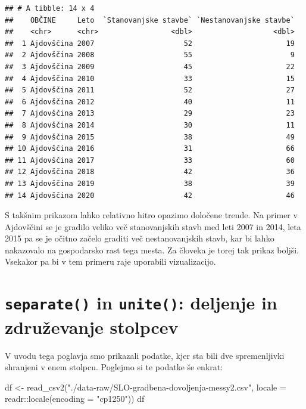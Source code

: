 \documentclass[
]{book}
\newenvironment{Shaded}{\begin{snugshade}}{\end{snugshade}}
\newcommand{\AttributeTok}[1]{\textcolor[rgb]{0.77,0.63,0.00}{#1}}
\newcommand{\FunctionTok}[1]{\textcolor[rgb]{0.00,0.00,0.00}{#1}}
\newcommand{\NormalTok}[1]{#1}
\newcommand{\OtherTok}[1]{\textcolor[rgb]{0.56,0.35,0.01}{#1}}
\newcommand{\SpecialCharTok}[1]{\textcolor[rgb]{0.00,0.00,0.00}{#1}}
\newcommand{\StringTok}[1]{\textcolor[rgb]{0.31,0.60,0.02}{#1}}
\begin{document}
\begin{verbatim}
## # A tibble: 14 x 4
##    OBČINE     Leto  `Stanovanjske stavbe` `Nestanovanjske stavbe`
##    <chr>      <chr>                 <dbl>                   <dbl>
##  1 Ajdovščina 2007                     52                      19
##  2 Ajdovščina 2008                     55                       9
##  3 Ajdovščina 2009                     45                      22
##  4 Ajdovščina 2010                     33                      15
##  5 Ajdovščina 2011                     52                      27
##  6 Ajdovščina 2012                     40                      11
##  7 Ajdovščina 2013                     29                      23
##  8 Ajdovščina 2014                     30                      11
##  9 Ajdovščina 2015                     38                      49
## 10 Ajdovščina 2016                     31                      66
## 11 Ajdovščina 2017                     33                      60
## 12 Ajdovščina 2018                     42                      36
## 13 Ajdovščina 2019                     38                      39
## 14 Ajdovščina 2020                     42                      46
\end{verbatim}

S takšnim prikazom lahko relativno hitro opazimo določene trende. Na primer v Ajdovščini se je gradilo veliko več stanovanjskih stavb med leti 2007 in 2014, leta 2015 pa se je očitno začelo graditi več nestanovanjskih stavb, kar bi lahko nakazovalo na gospodarsko rast tega mesta. Za človeka je torej tak prikaz boljši. Vsekakor pa bi v tem primeru raje uporabili vizualizacijo.

\hypertarget{separate-in-unite-deljenje-in-zdruux17eevanje-stolpcev}{%
\section{\texorpdfstring{\texttt{separate()} in \texttt{unite()}: deljenje in združevanje stolpcev}{separate() in unite(): deljenje in združevanje stolpcev}}\label{separate-in-unite-deljenje-in-zdruux17eevanje-stolpcev}}

V uvodu tega poglavja smo prikazali podatke, kjer sta bili dve spremenljivki shranjeni v enem stolpcu. Poglejmo si te podatke še enkrat:

\begin{Shaded}
\begin{Highlighting}[]
\NormalTok{df }\OtherTok{\textless{}{-}} \FunctionTok{read\_csv2}\NormalTok{(}\StringTok{"./data{-}raw/SLO{-}gradbena{-}dovoljenja{-}messy2.csv"}\NormalTok{,}
                \AttributeTok{locale =}\NormalTok{ readr}\SpecialCharTok{::}\FunctionTok{locale}\NormalTok{(}\AttributeTok{encoding =} \StringTok{"cp1250"}\NormalTok{))}
\NormalTok{df}
\end{Highlighting}
\end{Shaded}
\end{document}
